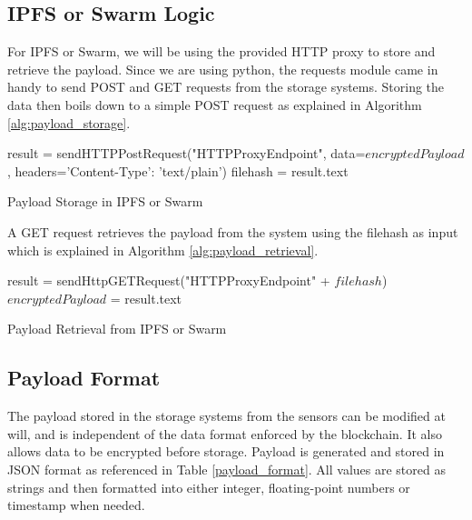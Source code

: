 \documentclass[11pt,openright]{report}
\begin{document}
\subsection{IPFS or Swarm Logic}

For IPFS or Swarm, we will be using the provided HTTP proxy to store and retrieve the payload. Since we are using python, the requests module came in handy to send POST and GET requests from the storage systems. Storing the data then boils down to a simple POST request as explained in Algorithm \ref{alg:payload_storage}.

\begin{algorithm}[setSwarmOrIPFSData]
  result = sendHTTPPostRequest("HTTPProxyEndpoint", data=$encryptedPayload$, headers={'Content-Type': 'text/plain'})\;
  filehash = result.text\;
 \caption{Payload Storage in IPFS or Swarm}
 \label{alg:payload_storage}
\end{algorithm}

A GET request retrieves the payload from the system using the filehash as input which is explained in Algorithm \ref{alg:payload_retrieval}.

\begin{algorithm}[getSwarmOrIPFSData]
  result = sendHttpGETRequest("HTTPProxyEndpoint" + $filehash$)\;
  $encryptedPayload$ = result.text\;
 \caption{Payload Retrieval from IPFS or Swarm}
 \label{alg:payload_retrieval}
\end{algorithm}

\subsection{Payload Format}
The payload stored in the storage systems from the sensors can be modified at will, and is independent of the data format enforced by the blockchain. It also allows data to be encrypted before storage. Payload is generated and stored in JSON format as referenced in Table \ref{payload_format}. All values are stored as strings and then formatted into either integer, floating-point numbers or timestamp when needed.
\newpage
\end{document}
